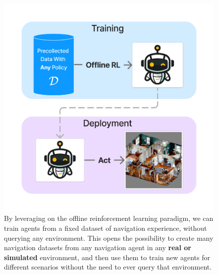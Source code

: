 \begin{figure}
    \centering
    \includegraphics[width=.8\linewidth]{figures/offnav/graphical_abstract}
    \caption{
    By leveraging on the offline reinforcement learning paradigm, we can train agents from a fixed dataset of navigation experience, without querying any environment.
    This opens the possibility to create many navigation datasets from any navigation agent in any \textbf{real or simulated} environment, and then use them to train new agents for different scenarios without the need to ever query that environment.
    }
    \label{fig:abstract}
\end{figure}




